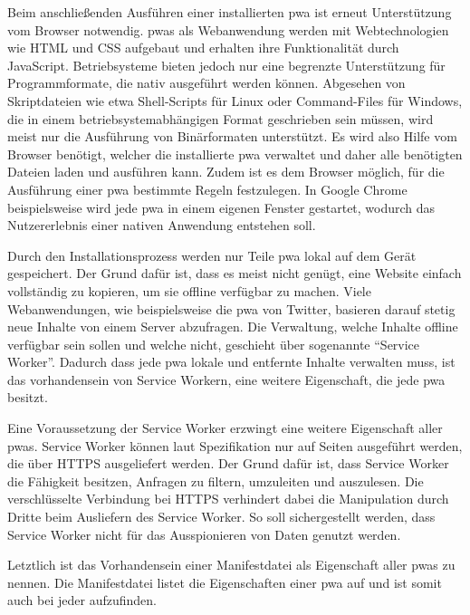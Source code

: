 \documentclass[12pt, parskip=half]{scrartcl}       %
\begin{document}
Beim anschließenden Ausführen einer installierten \ac{pwa} ist erneut Unterstützung vom Browser notwendig.
\acp{pwa} als Webanwendung werden mit Webtechnologien wie HTML und CSS aufgebaut und erhalten ihre Funktionalität durch JavaScript.
Betriebsysteme bieten jedoch nur eine begrenzte Unterstützung für Programmformate, die nativ ausgeführt werden können.
Abgesehen von Skriptdateien wie etwa Shell-Scripts für Linux oder Command-Files für Windows, die in einem betriebsystemabhängigen Format geschrieben sein müssen, wird meist nur die Ausführung von Binärformaten unterstützt\cite{fisher_executablelist}.
Es wird also Hilfe vom Browser benötigt, welcher die installierte \ac{pwa} verwaltet und daher alle benötigten Dateien laden und ausführen kann.
Zudem ist es dem Browser möglich, für die Ausführung einer \ac{pwa} bestimmte Regeln festzulegen.
In Google Chrome beispielsweise wird jede \ac{pwa} in einem eigenen Fenster gestartet, wodurch das Nutzererlebnis einer nativen Anwendung entstehen soll\cite{googledevs_pwa}.


Durch den Installationsprozess werden nur Teile \ac{pwa} lokal auf dem Gerät gespeichert.
Der Grund dafür ist, dass es meist nicht genügt, eine Website einfach vollständig zu kopieren, um sie offline verfügbar zu machen.
Viele Webanwendungen, wie beispielsweise die \ac{pwa} von Twitter\cite{twitter_pwa}, basieren darauf stetig neue Inhalte von einem Server abzufragen.
Die Verwaltung, welche Inhalte offline verfügbar sein sollen und welche nicht, geschieht über sogenannte \enquote{Service Worker}.
Dadurch dass jede \ac{pwa} lokale und entfernte Inhalte verwalten muss, ist das vorhandensein von Service Workern, eine weitere Eigenschaft, die jede \ac{pwa} besitzt.

Eine Voraussetzung der Service Worker erzwingt eine weitere Eigenschaft aller \acp{pwa}.
Service Worker können laut Spezifikation nur auf Seiten ausgeführt werden, die über HTTPS ausgeliefert werden.
Der Grund dafür ist, dass Service Worker die Fähigkeit besitzen, Anfragen zu filtern, umzuleiten und auszulesen.
Die verschlüsselte Verbindung bei HTTPS verhindert dabei die Manipulation durch Dritte beim Ausliefern des Service Worker.
So soll sichergestellt werden, dass Service Worker nicht für das Ausspionieren von Daten genutzt werden\cite{ServiceWorker_explained}.

Letztlich ist das Vorhandensein einer Manifestdatei als Eigenschaft aller \acp{pwa} zu nennen.
Die Manifestdatei listet die Eigenschaften einer \ac{pwa} auf und ist somit auch bei jeder aufzufinden.
\end{document}
